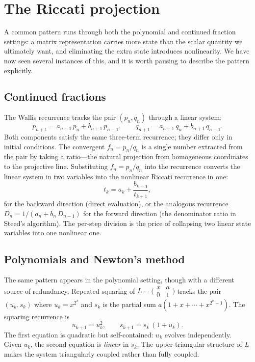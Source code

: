 \documentclass{article}
\begin{document}
\section{The Riccati projection}

A common pattern runs through both the polynomial and continued fraction settings: a matrix representation carries more state than the scalar quantity we ultimately want, and eliminating the extra state introduces nonlinearity. We have now seen several instances of this, and it is worth pausing to describe the pattern explicitly.

\subsection*{Continued fractions}

The Wallis recurrence tracks the pair $(p_n, q_n)$ through a linear system:
\begin{equation}
  p_{n+1} = a_{n+1}\, p_n + b_{n+1}\, p_{n-1}, \qquad
  q_{n+1} = a_{n+1}\, q_n + b_{n+1}\, q_{n-1}.
\end{equation}
Both components satisfy the same three-term recurrence; they differ only in initial conditions. The convergent $f_n = p_n/q_n$ is a single number extracted from the pair by taking a ratio---the natural projection from homogeneous coordinates to the projective line. Substituting $f_n = p_n/q_n$ into the recurrence converts the linear system in two variables into the nonlinear Riccati recurrence in one:
\begin{equation}
  t_k = a_k + \frac{b_{k+1}}{t_{k+1}},
\end{equation}
for the backward direction (direct evaluation), or the analogous recurrence $D_n = 1/(a_n + b_n\, D_{n-1})$ for the forward direction (the denominator ratio in Steed's algorithm). The per-step division is the price of collapsing two linear state variables into one nonlinear one.

\subsection*{Polynomials and Newton's method}

The same pattern appears in the polynomial setting, though with a different source of redundancy. Repeated squaring of $L = \bigl(\begin{smallmatrix} x & a \\ 0 & 1 \end{smallmatrix}\bigr)$ tracks the pair $(u_k, s_k)$ where $u_k = x^{2^k}$ and $s_k$ is the partial sum $a(1 + x + \cdots + x^{2^k - 1})$. The squaring recurrence is
\begin{equation}
  u_{k+1} = u_k^2, \qquad s_{k+1} = s_k\,(1 + u_k).
\end{equation}
The first equation is quadratic but self-contained: $u_k$ evolves independently. Given $u_k$, the second equation is \emph{linear} in $s_k$. The upper-triangular structure of $L$ makes the system triangularly coupled rather than fully coupled.
\end{document}
